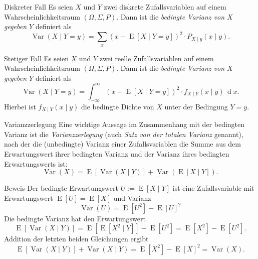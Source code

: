 \begin{bonus}{Diskreter Fall}
    Es seien $X$ und $Y$ zwei diskrete Zufallsvariablen auf einem Wahrscheinlichkeitsraum $(\Omega, \Sigma, P)$.
    Dann ist die \emph{bedingte Varianz von $X$ gegeben $Y$} definiert als
    \[
        \operatorname{Var}(X \mid Y = y) = \sum_x (x - \operatorname{E}[X \mid Y = y])^2 \cdot P_{X \mid y}(x \mid y).
    \]
\end{bonus}

\begin{bonus}{Stetiger Fall}
    Es seien $X$ und $Y$ zwei reelle Zufallsvariablen auf einem Wahrscheinlichkeitsraum $(\Omega, \Sigma, P)$.
    Dann ist die \emph{bedingte Varianz von $X$ gegeben $Y$} definiert als
    \[
        \operatorname{Var}(X \mid Y = y) = \int_{-\infty}^{\infty} (x - \operatorname{E}[X \mid Y = y])^2 \cdot f_{X \mid Y}(x \mid y) \, \operatorname{d}x.
    \]
    Hierbei ist $f_{X \mid Y}(x \mid y)$ die bedingte Dichte von $X$ unter der Bedingung $Y = y$.
\end{bonus}

\begin{defi}{Varianzzerlegung}
    Eine wichtige Aussage im Zusammenhang mit der bedingten Varianz ist die \emph{Varianzzerlegung} (auch \emph{Satz von der totalen Varianz} genannt), nach der die (unbedingte) Varianz einer Zufallsvariablen die Summe aus dem Erwartungswert ihrer bedingten Varianz und der Varianz ihres bedingten Erwartungswerts ist:
    \[
        \operatorname{Var}(X) = \operatorname{E}[\operatorname{Var}(X \mid Y)] + \operatorname{Var}(\operatorname{E}[X \mid Y]).
    \]
\end{defi}

\begin{bonus}[Varianzzerlegung]{Beweis}
    Der bedingte Erwartungswert $U := \operatorname{E}[X \mid Y]$ ist eine Zufallsvariable mit Erwartungswert $\operatorname{E}[U] = \operatorname{E}[X]$ und Varianz
    \[
        \operatorname{Var}(U) = \operatorname{E}[U^2] - \operatorname{E}[U]^2
    \]
    Die bedingte Varianz hat den Erwartungswert
    \[
        \operatorname{E}[\operatorname{Var}(X \mid Y)] = \operatorname{E}[\operatorname{E}[X^2 \mid Y]] - \operatorname{E}[U^2] = \operatorname{E}[X^2] - \operatorname{E}[U^2].
    \]
    Addition der letzten beiden Gleichungen ergibt
    \[
        \operatorname{E}[\operatorname{Var}(X \mid Y)] +\operatorname{Var}(X \mid Y) = \operatorname{E}[X^2] - \operatorname{E}[X]^2 = \operatorname{Var}(X).
    \]
\end{bonus}

